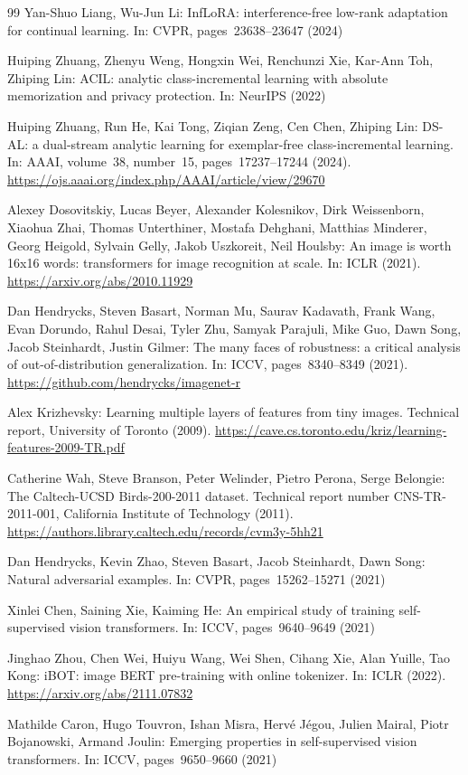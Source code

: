 \documentclass[runningheads]{llncs}
\begin{document}
\begin{thebibliography}{99}
Yan-Shuo Liang, Wu-Jun Li: InfLoRA: interference-free low-rank adaptation for
continual learning. In: CVPR, pages~23638--23647 (2024)


Huiping Zhuang, Zhenyu Weng, Hongxin Wei, Renchunzi Xie, Kar-Ann Toh,
Zhiping Lin: ACIL: analytic
class-incremental learning with absolute memorization and privacy protection.
In: NeurIPS (2022)

Huiping Zhuang, Run He, Kai Tong, Ziqian Zeng, Cen Chen, Zhiping Lin:
DS-AL: a dual-stream analytic learning for exemplar-free class-incremental
learning. In: AAAI, volume~38, number~15, pages~17237--17244 (2024).
\url{https://ojs.aaai.org/index.php/AAAI/article/view/29670}

Alexey Dosovitskiy, Lucas Beyer, Alexander Kolesnikov, Dirk Weissenborn,
Xiaohua Zhai, Thomas Unterthiner, Mostafa Dehghani, Matthias Minderer,
Georg Heigold, Sylvain Gelly, Jakob Uszkoreit, Neil Houlsby: An image is worth
16x16 words: transformers for image
recognition at scale. In: ICLR (2021).
\url{https://arxiv.org/abs/2010.11929}

Dan Hendrycks, Steven Basart, Norman Mu, Saurav Kadavath, Frank Wang,
Evan Dorundo, Rahul Desai, Tyler Zhu, Samyak Parajuli, Mike Guo, Dawn Song,
Jacob Steinhardt, Justin Gilmer: The many faces of
robustness: a critical analysis of out-of-distribution generalization. In: ICCV,
pages~8340--8349 (2021). \url{https://github.com/hendrycks/imagenet-r}

Alex Krizhevsky: Learning multiple layers of features from tiny images.
Technical report, University of Toronto (2009).
\url{https://cave.cs.toronto.edu/kriz/learning-features-2009-TR.pdf}

Catherine Wah, Steve Branson, Peter Welinder, Pietro Perona, Serge Belongie: The
Caltech-UCSD Birds-200-2011 dataset. Technical report number CNS-TR-2011-001,
California Institute of Technology (2011).
\url{https://authors.library.caltech.edu/records/cvm3y-5hh21}

Dan Hendrycks, Kevin Zhao, Steven Basart, Jacob Steinhardt, Dawn Song: Natural
adversarial examples. In: CVPR, pages~15262--15271 (2021)

Xinlei Chen, Saining Xie, Kaiming He: An empirical study of training self-supervised
vision transformers. In: ICCV, pages~9640--9649 (2021)

Jinghao Zhou, Chen Wei, Huiyu Wang, Wei Shen, Cihang Xie, Alan Yuille,
Tao Kong:
iBOT: image BERT pre-training with online tokenizer. In: ICLR (2022).
\url{https://arxiv.org/abs/2111.07832}

Mathilde Caron, Hugo Touvron, Ishan Misra, Hervé Jégou, Julien Mairal,
Piotr Bojanowski, Armand Joulin: Emerging properties in self-supervised vision
transformers. In: ICCV, pages~9650--9660 (2021)


\end{thebibliography}
\end{document}
